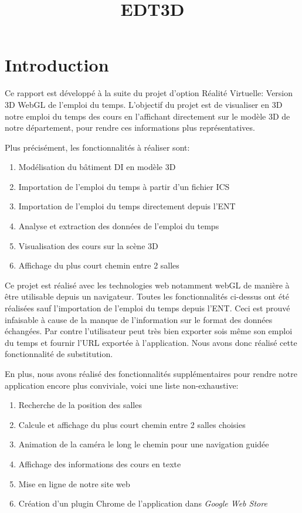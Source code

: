 \documentclass[twoside]{EPURapport}
\begin{document}
\title{EDT3D}

\chapter{Introduction}
Ce rapport est développé à la suite du projet d'option Réalité Virtuelle: Version 3D WebGL de l'emploi du temps. L'objectif du projet est de visualiser en 3D notre emploi du temps des cours en l'affichant directement sur le modèle 3D de notre département, pour rendre ces informations plus représentatives.

\bigskip

Plus précisément, les fonctionnalités à réaliser sont:
\begin{enumerate}
	\item Modélisation du bâtiment DI en modèle 3D
    \item Importation de l'emploi du temps à partir d'un fichier ICS
    \item Importation de l'emploi du temps directement depuis l'ENT
    \item Analyse et extraction des données de l'emploi du temps
    \item Visualisation des cours sur la scène 3D
    \item Affichage du plus court chemin entre 2 salles
\end{enumerate}

\bigskip

Ce projet est réalisé avec les technologies web notamment webGL de manière à être utilisable depuis un navigateur. Toutes les fonctionnalités ci-dessus ont été réalisées sauf l'importation de l'emploi du temps depuis l'ENT. Ceci est prouvé infaisable à cause de la manque de l'information sur le format des données échangées. Par contre l'utilisateur peut très bien exporter sois même son emploi du temps et fournir l'URL exportée à l'application. Nous avons donc réalisé cette fonctionnalité de substitution.

\bigskip

En plus, nous avons réalisé des fonctionnalités supplémentaires pour rendre notre application encore plus conviviale, voici une liste non-exhaustive:
\begin{enumerate}
	\item Recherche de la position des salles
    \item Calcule et affichage du plus court chemin entre 2 salles choisies
    \item Animation de la caméra le long le chemin pour une navigation guidée
    \item Affichage des informations des cours en texte
    \item Mise en ligne de notre site web
    \item Création d'un plugin Chrome de l'application dans \textit{Google Web Store}
\end{enumerate}
\end{document}

